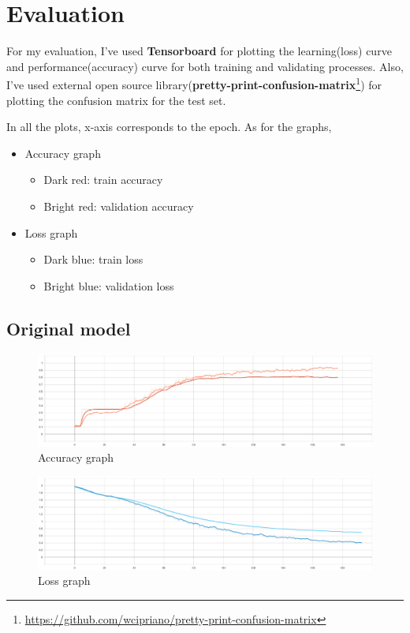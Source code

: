 \chapter{Evaluation}
For my evaluation, I've used {\bf Tensorboard} for plotting the learning(loss) curve and performance(accuracy) curve for both training and validating processes. Also, I've used external open source library({\bf pretty-print-confusion-matrix}\footnote{\url{https://github.com/wcipriano/pretty-print-confusion-matrix}}) for plotting the confusion matrix for the test set.

In all the plots, x-axis corresponds to the epoch.
As for the graphs,

\begin{itemize}
\item Accuracy graph
	\begin{itemize}
	\item Dark red: train accuracy
	\item Bright red: validation accuracy
	\end{itemize}

\item Loss graph
	\begin{itemize}
	\item Dark blue: train loss
	\item Bright blue: validation loss
	\end{itemize}
\end{itemize}

\newpage
\section{Original model}

\begin{figure}[htbp]
\centering
\includegraphics[width=0.7\linewidth]{evaluation/fig/Accuracy0.png}
\caption{Accuracy graph}
\label{fig:accuracy0}
\end{figure}

\begin{figure}[htbp]
\centering
\includegraphics[width=0.7\linewidth]{evaluation/fig/Loss0.png}
\caption{Loss graph}
\label{fig:evaluation0}
\end{figure}

